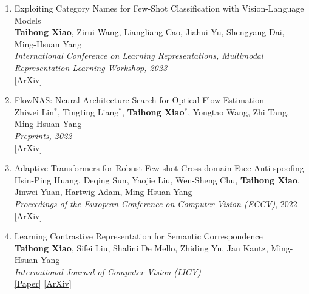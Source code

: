 \documentclass[letterpaper]{article}
\begin{document}
\begin{enumerate}


\item Exploiting Category Names for Few-Shot Classification with Vision-Language Models \\
	{\bf Taihong Xiao}, Zirui Wang, Liangliang Cao, Jiahui Yu, Shengyang Dai, Ming-Hsuan Yang \\
	{\it International Conference on Learning Representations, Multimodal Representation Learning Workshop, 2023} \\
	\href{https://arxiv.org/abs/2211.16594}{[ArXiv]}

	
\item FlowNAS: Neural Architecture Search for Optical Flow Estimation \\
	Zhiwei Lin$^*$, Tingting Liang$^*$, {\bf Taihong Xiao}$^*$, Yongtao Wang, Zhi Tang, Ming-Hsuan Yang \\
	{\it Preprints, 2022} \\
	\href{https://arxiv.org/abs/2207.01271}{[ArXiv]}
	
\item Adaptive Transformers for Robust Few-shot Cross-domain Face Anti-spoofing \\
	Hsin-Ping Huang, Deqing Sun, Yaojie Liu, Wen-Sheng Chu, {\bf Taihong Xiao}, Jinwei Yuan, Hartwig Adam, Ming-Hsuan Yang \\
	{\it Proceedings of the European Conference on Computer Vision (ECCV)}, 2022 \\
	\href{https://arxiv.org/abs/2203.12175}{[ArXiv]}
	
\item Learning Contrastive Representation for Semantic Correspondence \\
	{\bf Taihong Xiao}, Sifei Liu, Shalini De Mello, Zhiding Yu, Jan Kautz, Ming-Hsuan Yang \\
	{\it International Journal of Computer Vision (IJCV)} \\
	\href{https://link.springer.com/article/10.1007/s11263-022-01602-y}{[Paper]}
	\href{https://arxiv.org/abs/2109.10967}{[ArXiv]}


\end{enumerate}
\end{document}
